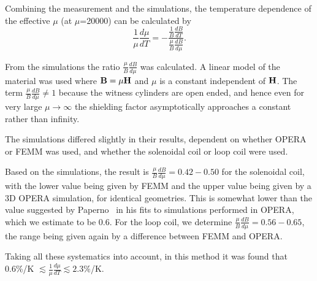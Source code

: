 Combining the measurement and the simulations, the temperature
dependence of the effective $\mu$ (at $\mu$=20000) can be calculated
by
\begin{equation}
\frac{1}{\mu}\frac{d\mu}{dT}=-\frac{\frac{1}{B}\frac{dB}{dT}}{\frac{\mu}{B}\frac{dB}{d\mu}}.
\end{equation}

From the simulations the ratio $\frac{\mu}{B} \frac{dB}{d\mu}$ was
calculated.  A linear model of the material was used where
$\bold{B}=\mu \bold{H}$ and $\mu$ is a constant independent of
$\bold{H}$.  The term $\frac{\mu}{B}\frac{dB}{d\mu}\neq 1$ because the
witness cylinders are open ended, and hence even for very large
$\mu\rightarrow\infty$ the shielding factor asymptotically approaches
a constant rather than infinity.

The simulations differed slightly in their results, dependent on
whether OPERA or FEMM was used, and whether the solenoidal coil or
loop coil were used.

Based on the simulations, the result is
$\frac{\mu}{B}\frac{dB}{d\mu}=0.42-0.50$ for the solenoidal coil, with
the lower value being given by FEMM and the upper value being given by
a 3D OPERA simulation, for identical geometries.  This is somewhat
lower than the value suggested by
Paperno~\cite{bib:paperno-open-ended} in his fits to simulations
performed in OPERA, which we estimate to be 0.6.  For the loop coil,
we determine $\frac{\mu}{B}\frac{dB}{d\mu}=0.56-0.65$, the range being
given again by a difference between FEMM and OPERA.





Taking all these systematics into account, in this method it was found that 0.6\%/K
$\lesssim\frac{1}{\mu}\frac{d\mu}{dT}\lesssim 2.3\%$/K. 



